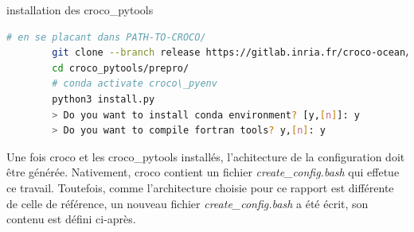 \documentclass[10pt,a4paper,titlepage]{article}
\begin{document}
\begin{codeEnv}{installation des croco\_pytools}
    \begin{lstlisting}[language=bash]
        # en se placant dans PATH-TO-CROCO/
        git clone --branch release https://gitlab.inria.fr/croco-ocean/croco_pytools.git
        cd croco_pytools/prepro/
        # conda activate croco\_pyenv
        python3 install.py
        > Do you want to install conda environment? [y,[n]]: y
        > Do you want to compile fortran tools? y,[n]: y
    \end{lstlisting}
\end{codeEnv}

Une fois croco et les croco\_pytools installés, l'achitecture de la configuration doit être générée. Nativement, croco contient un fichier \textit{create\_config.bash} qui effetue ce travail. Toutefois, comme l'architecture choisie pour ce rapport est différente de celle de référence, un nouveau fichier \textit{create\_config.bash} a été écrit, son contenu est défini ci-après.
\end{document}
